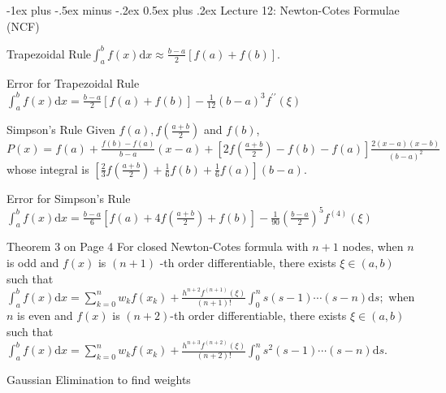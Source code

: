 \documentclass[10pt,landscape]{article}
\makeatletter
\renewcommand{\section}{\@startsection{section}{1}{0mm}%
                                {-1ex plus -.5ex minus -.2ex}%
                                {0.5ex plus .2ex}%
                                {\normalfont\large\bfseries}}
\theoremstyle{definition}
\newcommand{\thistheoremname}{}
\newtheorem*{genericthm*}{\thistheoremname}
\newenvironment{namedthm*}[1]
{\renewcommand{\thistheoremname}{#1}\begin{genericthm*}}
{\end{genericthm*}}
\makeatother
\begin{document}
\begin{multicols}{3}
	\section{Lecture 12: Newton-Cotes Formulae (NCF)}
	\begin{namedthm*}{Trapezoidal Rule}\(\int_{a}^{b} f(x) \mathrm{d} x \approx \frac{b-a}{2}[f(a)+f(b)]\).
	\end{namedthm*}
	\begin{namedthm*}{Error for Trapezoidal Rule}\(\int_{a}^{b} f(x) \mathrm{d} x=\frac{b-a}{2}[f(a)+f(b)]-\frac{1}{12}(b-a)^{3} f^{\prime \prime}(\xi)\)
	\end{namedthm*}
	\begin{namedthm*}{Simpson's Rule} Given \(f(a), f\left(\frac{a+b}{2}\right)\) and \(f(b)\), \(P(x)=f(a)+\frac{f(b)-f(a)}{b-a}(x-a)+\left[2 f\left(\frac{a+b}{2}\right)-f(b)-f(a)\right] \frac{2(x-a)(x-b)}{(b-a)^{2}}\) whose integral is \(\left[\frac{2}{3} f\left(\frac{a+b}{2}\right)+\frac{1}{6} f(b)+\frac{1}{6} f(a)\right](b-a)\).
	\end{namedthm*}
	\begin{namedthm*}{Error for Simpson's Rule}\(\int_{a}^{b} f(x) \mathrm{d} x=\frac{b-a}{6}\left[f(a)+4 f\left(\frac{a+b}{2}\right)+f(b)\right]-\frac{1}{90}\left(\frac{b-a}{2}\right)^{5} f^{(4)}(\xi)\)
	\end{namedthm*}
	\begin{namedthm*}{Theorem 3 on Page 4}
		For closed Newton-Cotes formula with \(n+1\) nodes, when \(n\) is odd and \(f(x)\) is
		\((n+1)\) -th order differentiable, there exists \(\xi \in(a, b)\) such that \(\int_{a}^{b} f(x) \mathrm{d} x=\sum_{k=0}^{n} w_{k} f\left(x_{k}\right)+\frac{h^{n+2} f^{(n+1)}(\xi)}{(n+1) !} \int_{0}^{n} s(s-1) \cdots(s-n) \mathrm{d} s;\) when \(n\) is even and \(f(x)\) is \((n+2)\)-th order differentiable, there exists \(\xi \in(a, b)\) such that \(\int_{a}^{b} f(x) \mathrm{d} x=\sum_{k=0}^{n} w_{k} f\left(x_{k}\right)+\frac{h^{n+3} f^{(n+2)}(\xi)}{(n+2) !} \int_{0}^{n} s^{2}(s-1) \cdots(s-n) \mathrm{d} s\).
	\end{namedthm*}
	\begin{namedthm*}{Gaussian Elimination to find weights}

\end{namedthm*}
\end{multicols}
\end{document}
